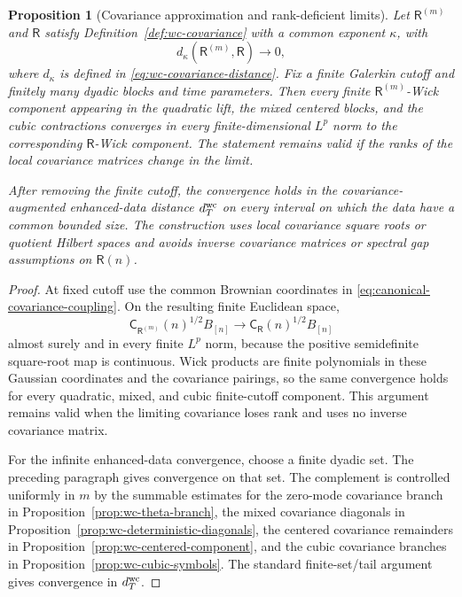 \documentclass[10pt]{amsart}
\numberwithin{equation}{section}
\theoremstyle{plain}
\newtheorem{proposition}[theorem]{Proposition}
\theoremstyle{definition}
\theoremstyle{remark}
\begin{document}
\begin{proposition}[Covariance approximation and rank-deficient limits]\label{prop:wc-covariance-approximation}
Let \(\mathsf R^{(m)}\) and \(\mathsf R\) satisfy Definition~\ref{def:wc-covariance} with a common exponent \(\kappa\), with
\[
        d_\kappa(\mathsf R^{(m)},\mathsf R)\to0,
\]
where \(d_\kappa\) is defined in \eqref{eq:wc-covariance-distance}.  Fix a finite Galerkin cutoff and finitely many dyadic blocks and time parameters.  Then every finite \(\mathsf R^{(m)}\)-Wick component appearing in the quadratic lift, the mixed centered blocks, and the cubic contractions converges in every finite-dimensional \(L^p\) norm to the corresponding \(\mathsf R\)-Wick component.  The statement remains valid if the ranks of the local covariance matrices change in the limit.

After removing the finite cutoff, the convergence holds in the covariance-augmented enhanced-data distance \(d_T^{\rm wc}\) on every interval on which the data have a common bounded size.  The construction uses local covariance square roots or quotient Hilbert spaces and avoids inverse covariance matrices or spectral gap assumptions on \(\mathsf R(n)\).
\end{proposition}

\begin{proof}
At fixed cutoff use the common Brownian coordinates in \eqref{eq:canonical-covariance-coupling}.  On the resulting finite Euclidean space,
\[
 \mathsf C_{\mathsf R^{(m)}}(n)^{1/2}B_{[n]}
 \longrightarrow
 \mathsf C_{\mathsf R}(n)^{1/2}B_{[n]}
\]
almost surely and in every finite $L^p$ norm, because the positive semidefinite square-root map is continuous.  Wick products are finite polynomials in these Gaussian coordinates and the covariance pairings, so the same convergence holds for every quadratic, mixed, and cubic finite-cutoff component.  This argument remains valid when the limiting covariance loses rank and uses no inverse covariance matrix.

For the infinite enhanced-data convergence, choose a finite dyadic set.  The preceding paragraph gives convergence on that set.  The complement is controlled uniformly in \(m\) by the summable estimates for the zero-mode covariance branch in Proposition~\ref{prop:wc-theta-branch}, the mixed covariance diagonals in Proposition~\ref{prop:wc-deterministic-diagonals}, the centered covariance remainders in Proposition~\ref{prop:wc-centered-component}, and the cubic covariance branches in Proposition~\ref{prop:wc-cubic-symbols}.  The standard finite-set/tail argument gives convergence in \(d_T^{\rm wc}\).
\end{proof}
\end{document}
